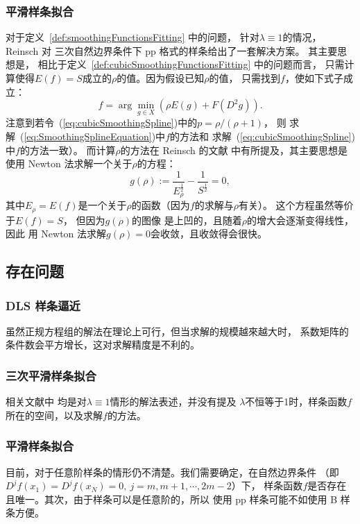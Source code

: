 \subsubsection{平滑样条拟合}
对于定义~\ref{def:smoothingFunctionsFitting} 中的问题，
针对$\lambda\equiv 1$的情况，
Reinsch \cite{SmoothingBySplineFunctions}对
三次自然边界条件下 pp 格式的样条给出了一套解决方案。
其主要思想是，
相比于定义~\ref{def:cubicSmoothingFunctionsFitting} 中的问题而言，
只需计算使得$E(f)=S$成立的$\rho$的值。因为假设已知$\rho$的值，
只需找到$f$，使如下式子成立：
\begin{equation}
  \label{eq:SmoothingSplineEquation}
  f=\arg \min_{g\in X}\left(\rho E(g)+ F(D^{2}g)\right).
\end{equation}
注意到若令~(\ref{eq:cubicSmoothingSpline})中的$p=\rho/(\rho+1)$，
则
求解~(\ref{eq:SmoothingSplineEquation})中$f$的方法和
求解~(\ref{eq:cubicSmoothingSpline})中$f$的方法一致）。
而计算$\rho$的方法在 Reinsch 的文献
\cite{SmoothingBySplineFunctions,SmoothingBySplineFunctionsII}
中有所提及，其主要思想是使用 Newton 法求解一个关于$\rho$的方程：
\begin{equation}
  \label{eq:rhoEqnForNewton1}
  g(\rho):= \frac{1}{E_{\rho}^{\frac{1}{2}}}
  -\frac{1}{S^{\frac{1}{2}}}=0,
\end{equation}
其中$E_{\rho}=E(f)$是一个关于$\rho$的函数（因为$f$的求解与$\rho$有关）。
这个方程虽然等价于$E(f)=S$，
但因为$g(\rho)$的图像
是上凹的，且随着$\rho$的增大会逐渐变得线性，因此
用 Newton 法求解$g(\rho)=0$会收敛，且收敛得会很快。

\subsection{存在问题}

\subsubsection{ DLS 样条逼近}
虽然正规方程组的解法在理论上可行，但当求解的规模越來越大时，
系数矩阵的条件数会平方增长，这对求解精度是不利的。

\subsubsection{三次平滑样条拟合}
相关文献\cite{GuideToSplines,SmoothingBySplineFunctions}中
均是对$\lambda\equiv 1$情形的解法表述，并没有提及
$\lambda$不恒等于1时，样条函数$f$所在的空间，以及求解$f$的方法。

\subsubsection{平滑样条拟合}
目前，对于任意阶样条的情形仍不清楚。我们需要确定，在自然边界条件
（即$D^{j}f(x_{1})=D^{j}f(x_{N})=0,\ j=m,m+1,\cdots,2m-2$）下，
样条函数$f$是否存在且唯一。其次，由于样条可以是任意阶的，所以
使用 pp 样条可能不如使用 B 样条方便。

